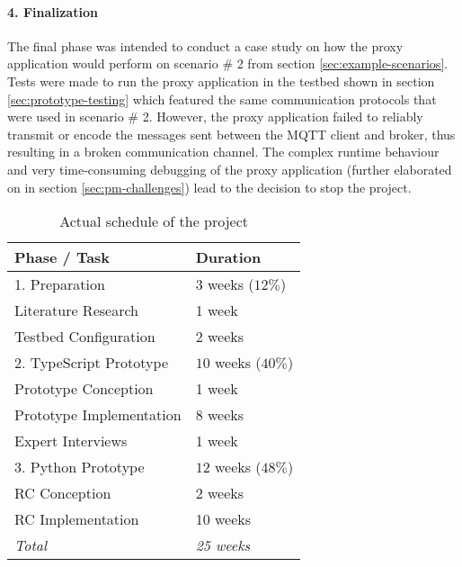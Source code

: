 \paragraph{4. Finalization} The final phase was intended to conduct a case study on how the proxy application would perform on scenario \# 2 from section \ref{sec:example-scenarios}. Tests were made to run the proxy application in the testbed shown in section \ref{sec:prototype-testing} which featured the same communication protocols that were used in scenario \# 2. However, the proxy application failed to reliably transmit or encode the messages sent between the \ac{MQTT} client and broker, thus resulting in a broken communication channel. The complex runtime behaviour and very time-consuming debugging of the proxy application (further elaborated on in section \ref{sec:pm-challenges}) lead to the decision to stop the project.

\begin{table}
    \centering
    \begin{tabular}{l l}
        \toprule
        Phase / Task             & Duration            \\
        \midrule
        1. Preparation           & $3$ weeks ($12\%$)  \\
        \midrule
        Literature Research      & 1 week              \\
        Testbed Configuration    & 2 weeks             \\
        \midrule
        2. TypeScript Prototype  & $10$ weeks ($40\%$) \\
        \midrule
        Prototype Conception     & 1 week              \\
        Prototype Implementation & 8 weeks             \\
        Expert Interviews        & 1 week              \\
        \midrule
        3. Python Prototype      & $12$ weeks ($48\%$) \\
        \midrule
        RC Conception            & 2 weeks             \\
        RC Implementation        & 10 weeks            \\
        \midrule
        \midrule
        \emph{Total}             & \emph{25 weeks}     \\
        \bottomrule
    \end{tabular}
    \caption{Actual schedule of the project}
    \label{fig:thesis-schedule-actual}
\end{table}

